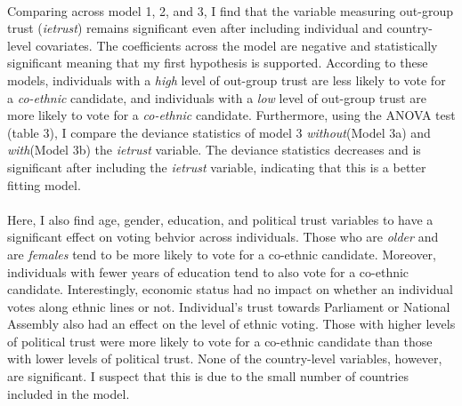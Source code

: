 \documentclass[a4paper, 12pt]{article}
\begin{document}
\paragraph{}
Comparing across model 1, 2, and 3, I find that the variable measuring out-group trust (\textit{ietrust}) remains significant even after including individual and country-level covariates. The coefficients across the model are negative and statistically significant meaning that my first hypothesis is supported. According to these models, individuals with a \textit{high} level of out-group trust are less likely to vote for a \textit{co-ethnic} candidate, and individuals with a \textit{low} level of out-group trust are more likely to vote for a \textit{co-ethnic} candidate. Furthermore, using the ANOVA test (table 3), I compare the deviance statistics of model 3 \textit{without}(Model 3a) and \textit{with}(Model 3b) the \textit{ietrust} variable. The deviance statistics decreases and is significant after including the \textit{ietrust} variable, indicating that this is a better fitting model.
	\begin{table}[H]
	\setlength{\arrayrulewidth}{1mm}
	\setlength{\tabcolsep}{18pt}
	\renewcommand{\arraystretch}{2}
	\Huge
	\centering
\caption{ANOVA Test Comparing Models With and Without Out-Group Trust}
\end{table}
\paragraph{}
Here, I also find age, gender, education, and political trust variables to have a significant effect on voting behvior across individuals. Those who are \textit{older} and are \textit{females} tend to be more likely to vote for a co-ethnic candidate. Moreover, individuals with fewer years of education tend to also vote for a co-ethnic candidate. Interestingly, economic status had no impact on whether an individual votes along ethnic lines or not. Individual's trust towards Parliament or National Assembly also had an effect on the level of ethnic voting. Those with higher levels of political trust were more likely to vote for a co-ethnic candidate than those with lower levels of political trust. None of the country-level variables, however, are significant. I suspect that this is due to the small number of countries included in the model. 
\end{document}
